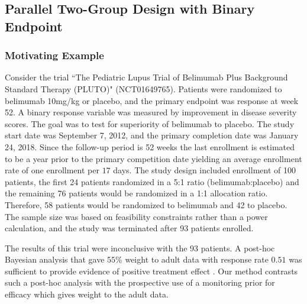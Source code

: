 \documentclass[useAMS,usenatbib,referee]{biom}
\begin{document}

\subsection{Parallel Two-Group Design with Binary Endpoint}\label{sec:example2}
\subsubsection{Motivating Example}
Consider the trial ``The Pediatric Lupus Trial of Belimumab Plus Background Standard Therapy (PLUTO)" (NCT01649765). Patients were randomized to belimumab 10mg/kg or placebo, and the primary endpoint was response at week 52. A binary response variable was measured by improvement in disease severity scores. The goal was to test for superiority of belimumab to placebo. 
The study start date was September 7, 2012, and the primary completion date was January 24, 2018. Since the follow-up period is 52 weeks the last enrollment is estimated to be a year prior to the primary competition date yielding an average enrollment rate of one enrollment per $17$ days. The study design included enrollment of 100 patients, the first 24 patients randomized in a 5:1 ratio (belimumab:placebo) and the remaining 76 patients would be randomized in a 1:1 allocation ratio. Therefore, 58 patients would be randomized to belimumab and 42 to placebo. The sample size was based on feasibility constraints rather than a power calculation, and the study was terminated after 93 patients enrolled.

The results of this trial were inconclusive with the 93 patients. A post-hoc Bayesian analysis that gave $55\%$ weight to adult data with response rate $0.51$ was sufficient to provide evidence of positive treatment effect \citep{Travis2019}. Our method contrasts such a post-hoc analysis with the prospective use of a monitoring prior for efficacy which gives weight to the adult data.
\end{document}
